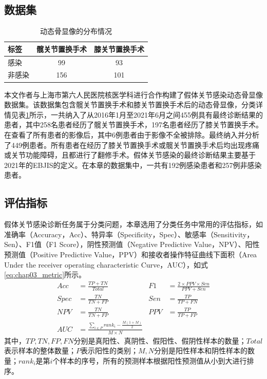 \subsection{数据集}

\begin{table}[htbp]
  \centering
  \caption{动态骨显像的分布情况}
  \begin{tabular}{lcc}
    \toprule
    标签   & 髋关节置换手术 & 膝关节置换手术 \\
    \midrule
    感染   & 99             & 93             \\
    非感染 & 156            & 101            \\
    \bottomrule
  \end{tabular}
  \label{tab:chap03_dataset}
\end{table}

本文作者与上海市第六人民医院核医学科进行合作构建了假体关节感染动态骨显像数据集。该数据集包含髋关节置换手术和膝关节置换手术后的动态骨显像，分类详情见表\ref{tab:chap03_dataset}所示，一共纳入了从2016年1月至2021年6月之间455例具有最终诊断结果的患者，其中258名患者经历了髋关节置换手术，197名患者经历了膝关节置换手术。在查看了所有患者的影像后，其中6例患者由于影像不全被排除。最终纳入并分析了449例患者。所有患者在经历了膝关节置换手术或髋关节置换手术后均出现疼痛或关节功能障碍，且都进行了翻修手术。假体关节感染的最终诊断结果主要基于2021年的EBJIS的定义\cite{mcnally2021ebjis}。在本章的数据集中，一共有192例感染患者和257例非感染患者。

\subsection{评估指标}

假体关节感染诊断任务属于分类问题，本章选用了分类任务中常用的评估指标，如准确率（Accuracy，Acc）、特异率（Specificity，Spec）、敏感率（Sensitivity，Sen）、F1值（F1 Score），阴性预测值（Negative Predictive Value，NPV）、阳性预测值（Positive Predictive Value，PPV）和接收者操作特征曲线下面积（Area Under the receiver operating characteristic Curve，AUC），如式\ref{eq:chap03_metric}所示。
\begin{equation}
  \begin{aligned}
    Acc  & = \frac{TP+TN}{Total}                                         & F1  & = \frac{2 \times PPV \times Sen}{PPV + Sen} \\
    Spec & = \frac{TN}{TN+FP}                                            & Sen & = \frac{TP}{TP+FN}                          \\
    NPV  & = \frac{TN}{TN+FP}                                            & PPV & = \frac{TP}{TP+FP}                          \\
    AUC  & = \frac{\sum_{i \in P} rank_i - \frac{M(1+M)}{2}}{M \times N} &     &
  \end{aligned}
  \label{eq:chap03_metric}
\end{equation}
其中，\(TP,TN,FP,FN\)分别是真阳性、真阴性、假阳性、假阴性样本的数量；\(Total\)表示样本的整体数量；\(P\)表示阳性的类别；\(M,N\)分别是阳性样本和阴性样本的数量；\(rank_i\)是第\(i\)个样本的序号，所有的预测样本根据阳性预测值从小到大进行排序。

